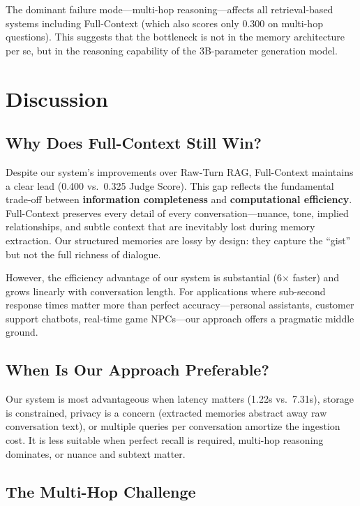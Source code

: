 \documentclass[11pt]{article}
\begin{document}
The dominant failure mode---multi-hop reasoning---affects all retrieval-based systems including Full-Context (which also scores only 0.300 on multi-hop questions). This suggests that the bottleneck is not in the memory architecture per se, but in the reasoning capability of the 3B-parameter generation model.

\section{Discussion}

\subsection{Why Does Full-Context Still Win?}

Despite our system's improvements over Raw-Turn RAG, Full-Context maintains a clear lead (0.400 vs.\ 0.325 Judge Score). This gap reflects the fundamental trade-off between \textbf{information completeness} and \textbf{computational efficiency}. Full-Context preserves every detail of every conversation---nuance, tone, implied relationships, and subtle context that are inevitably lost during memory extraction. Our structured memories are lossy by design: they capture the ``gist'' but not the full richness of dialogue.

However, the efficiency advantage of our system is substantial (6$\times$ faster) and grows linearly with conversation length. For applications where sub-second response times matter more than perfect accuracy---personal assistants, customer support chatbots, real-time game NPCs---our approach offers a pragmatic middle ground.

\subsection{When Is Our Approach Preferable?}

Our system is most advantageous when latency matters (1.22s vs.\ 7.31s), storage is constrained, privacy is a concern (extracted memories abstract away raw conversation text), or multiple queries per conversation amortize the ingestion cost. It is less suitable when perfect recall is required, multi-hop reasoning dominates, or nuance and subtext matter.

\subsection{The Multi-Hop Challenge}
\end{document}
